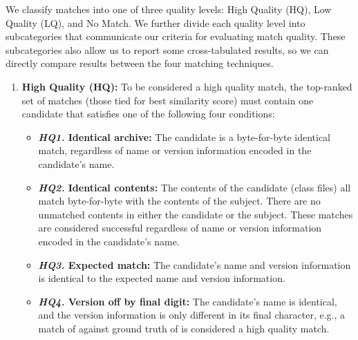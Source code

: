 \vspace{0.7em}

\noindent We classify matches into one of three quality levels: High
Quality (HQ), Low Quality (LQ), and No Match.  We further divide each
quality level into subcategories that communicate our criteria for
evaluating match quality.  These subcategories also allow us to report some
cross-tabulated results, so we can directly compare results between the
four matching techniques.


\begin{enumerate}
\item \textbf{High Quality (HQ):} 
    To be considered a high quality match, the top-ranked set of matches
    (those tied for best similarity score) must contain one candidate that
    satisfies one of the following four conditions:

\begin{itemize}

\vspace{0.7em}
\item \textbf{\emph{HQ1.} Identical archive:}
    The candidate is a byte-for-byte identical match, regardless of name or
    version information encoded in the candidate's name.

\vspace{0.7em}
\item \textbf{\emph{HQ2.} Identical contents:}
    The contents of the candidate (class files) all match byte-for-byte
    with the contents of the subject.  There are no unmatched contents in
    either the candidate or the subject.  These matches are considered
    successful regardless of name or version information encoded in the
    candidate's name.

\vspace{0.7em}
\item \textbf{\emph{HQ3.} Expected match:}
    The candidate's name and version information is identical to the
    expected name and version information.

\vspace{0.7em}
\item \textbf{\emph{HQ4.} Version off by final digit:}
    The candidate's name is identical, and the version information is only
    different in its final character, e.g., a match of
     against ground truth of
     is considered a high quality match.

\end{itemize}


\end{enumerate}
